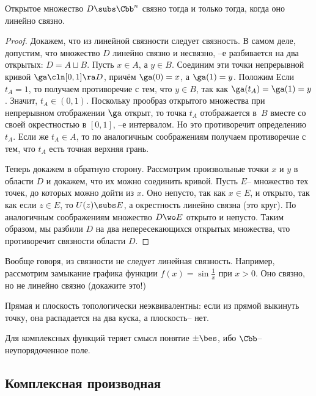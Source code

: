 \documentclass[a4paper]{article}
\begin{document}
\begin{stm}
Открытое множество $D \subs \Cbb^n$ связно тогда и только тогда, когда оно линейно связно.
\end{stm}
\begin{proof}
 Докажем, что из линейной связности следует связность.
В самом деле, допустим, что множество $D$ линейно связно и несвязно, --е разбивается на два открытых: $D = A \sqcup B$.
Пусть $x \in A$, а $y \in B$. Соединим эти точки непрерывной кривой $\ga\cln[0,1]\ra D$, причём $\ga(0)=x$, а $\ga(1)=y$.
Положим
Если $t_A = 1$, то получаем противоречие с тем, что $y \in B$, так
как $\ga(t_A)=\ga(1)=y$. Значит, $t_A \in (0,1)$. Поскольку прообраз открытого множества при непрерывном
отображении $\ga$ открыт, то точка $t_A$ отображается в~$B$ вместе со своей окрестностью в $[0,1]$, --е интервалом. Но это противоречит
определению $t_A$. Если же $t_A \in A$, то по аналогичным соображениям получаем противоречие с тем, что $t_A$ есть точная верхняя грань.

 Теперь докажем в обратную сторону.
Рассмотрим произвольные точки $x$ и $y$ в области $D$ и докажем, что их можно соединить кривой.
Пусть $E$-- множество тех точек, до которых можно дойти из $x$. Оно непусто, так как $x \in E$, и открыто,
так как если $z \in E$, то $U(z) \subs E$, а окрестность линейно связна (это круг).
По аналогичным соображениям множество $D \wo E$ открыто и непусто. Таким образом, мы разбили $D$ на два непересекающихся
открытых множества, что противоречит связности области $D$.
\end{proof}

\begin{note}
Вообще говоря, из связности не следует линейная связность. Например, рассмотрим замыкание графика функции $f(x)=\sin \frac1x$ при $x > 0$.
Оно связно, но не линейно связно (докажите это!)
\end{note}

\begin{note}
Прямая и плоскость топологически неэквивалентны: если из прямой выкинуть точку, она распадается на два куска,
а плоскость-- нет.
\end{note}

\begin{note}
Для комплексных функций теряет смысл понятие $\pm \bes$, ибо $\Cbb$-- неупорядоченное поле.
\end{note}

\subsection{Комплексная производная}
\end{document}
